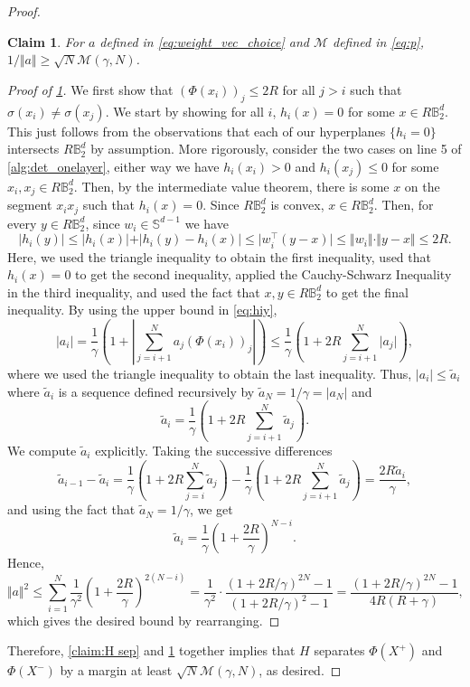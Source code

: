 \documentclass[aoap]{imsart}
\numberwithin{equation}{section}
\newtheorem{claim}[theorem]{Claim}
\theoremstyle{definition}
\theoremstyle{remark}
\numberwithin{equation}{section}
\renewcommand{\S}{\mathbb{S}}
\newcommand{\0}{\mathbf{0}}
\newcommand{\1}{\mathbf{1}}
\newcommand{\B}{\mathbb{B}}
\renewcommand{\S}{\mathbb{S}}
\numberwithin{equation}{section}
\begin{document}
\begin{proof}
\begin{claim}\label{claim:margin bd}
For $a$ defined in \eqref{eq:weight_vec_choice} and $\mathcal{M}$ defined in \eqref{eq:p}, $1/\Vert a\Vert \geq \sqrt{N}\mathcal{M}(\gamma, N)$.
\end{claim}
\begin{proof}[Proof of \cref{claim:margin bd}]
We first show that $(\Phi(x_i))_{j}\leq 2R$ for all $j>i$ such that $\sigma(x_i)\neq \sigma(x_j)$. We start by showing  for all $i$, $h_{i}(x)=0$ for some $x\in R\B_{2}^{d}$. This just follows from the observations that each of our hyperplanes $\lbrace h_i=0\rbrace$ intersects $R\B_2^d$ by assumption. More rigorously, consider the two cases on line 5 of \cref{alg:det_onelayer}, either way we have $h_{i}(x_{i})>0$ and $h_{i}(x_{j})\leq 0$ for some $x_{i}, x_{j}\in R\B_{2}^{d}$. Then, by the intermediate value theorem, there is some $x$ on the segment $x_{i}x_{j}$ such that $h_{i}(x)=0$. Since $R\B_{2}^{d}$ is convex, $x\in R\B^{d}_{2}$. Then, for every $y\in R\B_{2}^{d}$, since $w_{i}\in \S^{d-1}$ we have
\begin{equation}\label{eq:hiy}
\vert h_{i}(y)\vert \leq \vert h_{i}(x)\vert + \vert h_{i}(y)-h_{i}(x)\vert 
 \leq \vert w_{i}^{\intercal}(y-x)\vert 
\leq \Vert w_{i}\Vert \cdot \Vert y-x\Vert
\le 2R.
\end{equation}
Here, we used the triangle inequality to obtain the first inequality, used that $h_i(x) = 0$ to get the second inequality, applied the Cauchy-Schwarz Inequality in the third inequality, and used the fact that $x,y \in R\B_2^d$ to get the final inequality. By using the upper bound in \eqref{eq:hiy}, 
\[
\vert a_{i}\vert = \frac{1}{\gamma }\left( 1+\left|\sum_{j=i+1}^{N}a_{j}(\Phi(x_{i}))_{j}\right|\right)
\leq \frac{1}{\gamma} \left(1+2R \sum_{j=i+1}^{N}\vert a_{j}\vert\right),
\]
where we used the triangle inequality to obtain the last inequality. Thus, $\vert a_{i}\vert \leq \tilde{a}_{i}$ where $\tilde{a}_{i}$ is a sequence defined recursively by $\tilde{a}_{N}= 1/\gamma = \vert a_{N}\vert$ and 
\[
    \tilde{a}_{i} = \frac{1}{\gamma}\left(1 + 2R \sum_{j=i+1}^N \tilde{a}_j\right).
\]
We compute $\tilde{a}_{i}$ explicitly. Taking the successive differences
\[
    \tilde{a}_{i-1}-\tilde{a}_{i} = \frac{1}{\gamma}\left(1 + 2R \sum_{j=i}^N \tilde{a}_j\right) - \frac{1}{\gamma}\left(1 + 2R \sum_{j=i+1}^N \tilde{a}_j\right) = \frac{2R\tilde{a}_{i}}{\gamma},
\]
 and using the fact that $\tilde{a}_{N}= 1/\gamma$, we get
\[
    \tilde{a}_{i} = \frac{1}{\gamma}\left(1+\frac{2R}{\gamma}\right)^{N-i}.
\]
Hence,
\[
\Vert a\Vert ^{2} \leq \sum_{i=1}^{N}\frac{1}{\gamma^{2}}\left(1+\frac{2R}{\gamma}\right)^{2(N-i)} = \frac{1}{\gamma^{2}} \cdot \frac{(1+2R/\gamma)^{2N}-1}{(1+2R/\gamma )^{2}-1} = \frac{(1+2R/\gamma)^{2N}-1}{4R(R+\gamma)},
\]
which gives the desired bound by rearranging.
\end{proof}
Therefore, \cref{claim:H sep} and \cref{claim:margin bd} together implies that $H$ separates $\Phi(X^+)$ and $\Phi(X^-)$ by a margin at least $\sqrt{N}\mathcal{M}(\gamma, N)$, as desired.
\end{proof}
\end{document}
